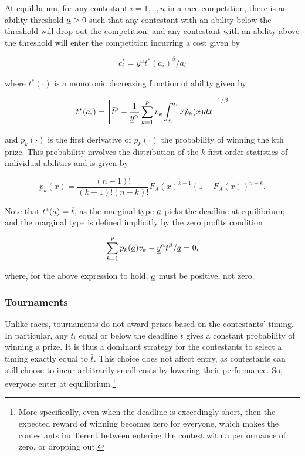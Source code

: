\documentclass[10pt, titlepage]{article}
\newcommand\deadline{\bar{t}}
\newcommand\target{\underline{y}}
\begin{document}
At equilibrium, for any contestant \(i=1, .., n\) in a race competition,
there is an ability threshold \(\underline{a}>0\) such that any contestant
with an ability below the threshold will drop out the competition; and
any contestant with an ability above the threshold will enter the
competition incurring a cost given by

\begin{equation}
    \label{cost races}
    c_i^* = \target^\alpha t^*(a_i)^\beta / a_i
\end{equation}

where \(t^*(\cdot)\) is a monotonic decreasing function of ability given
by

\begin{equation}
        t^*(a_i) = \left[
            \deadline^\beta - \frac{1}{\target^\alpha}\sum_{k=1}^{p} v_k \int_{\marginal}^{a_i} x \dot p_k(x) d x
        \right]^{1/\beta}
\end{equation}

and \(\dot p_k(\cdot)\) is the first derivative of \(p_k(\cdot)\) the
probability of winning the kth prize. This probability involves the
distribution of the \(k\) first order statistics of individual abilities
and is given by

\[
    p_k(x) = \frac{(n-1)!}{(k-1)!(n-k)!} F_A(x)^{k-1} (1-F_A(x))^{n-k}. 
\]

Note that \(t^*(\marginal)=\deadline\), as the marginal type
\(\underline{a}\) picks the deadline at equilibrium; and the marginal type
is defined implicitly by the zero profits condition

\begin{equation}
    \label{zero profits}
    \sum_{k=1}^p p_{k}(\marginal) v_k - \target^\alpha \deadline^\beta / \marginal = 0, 
\end{equation}

where, for the above expression to hold, \(\underline{a}\) must be positive,
not zero.

\subsubsection{Tournaments}\label{tournaments}

Unlike races, tournaments do not award prizes based on the contestants'
timing. In particular, any \(t_i\) equal or below the deadline
\(\deadline\) gives a constant probability of winning a prize. It is
thus a dominant strategy for the contestants to select a timing exactly
equal to \(\deadline\). This choice does not affect entry, as
contestants can still choose to incur arbitrarily small costs by
lowering their performance. So, everyone enter at equilibrium.\footnote{More
  specifically, even when the deadline is exceedingly short, then the
  expected reward of winning becomes zero for everyone, which makes the
  contestants indifferent between entering the contest with a
  performance of zero, or dropping out.}
\end{document}
